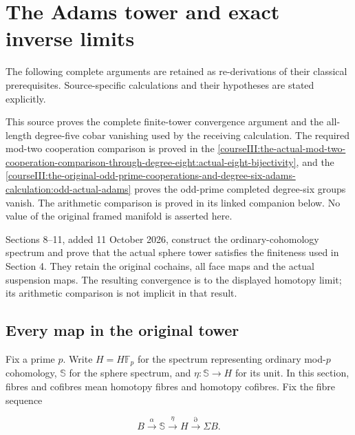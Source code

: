 \section{The Adams tower and exact inverse limits}\label{courseIII:the-adams-tower-and-exact-inverse-limits:section}

The following complete arguments are retained as re-derivations of their classical prerequisites. Source-specific calculations and their hypotheses are stated explicitly.

This source proves the complete finite-tower convergence argument and the all-length degree-five cobar vanishing used by the receiving calculation. The required mod-two cooperation comparison is proved in the \cref{courseIII:the-actual-mod-two-cooperation-comparison-through-degree-eight:actual-eight-bijectivity}, and the \cref{courseIII:the-original-odd-prime-cooperations-and-degree-six-adams-calculation:odd-actual-adams} proves the odd-prime completed degree-six groups vanish. The arithmetic comparison is proved in its linked companion below. No value of the original framed manifold is asserted here.

Sections 8--11, added 11 October 2026, construct the ordinary-cohomology spectrum and prove that the actual sphere tower satisfies the finiteness used in Section 4. They retain the original cochains, all face maps and the actual suspension maps. The resulting convergence is to the displayed homotopy limit; its arithmetic comparison is not implicit in that result.

\subsection{Every map in the original tower}
\label{courseIII:the-adams-tower-and-exact-inverse-limits:adams-original-tower}

\label{courseIII:the-adams-tower-and-exact-inverse-limits:section-1}\label{courseIII:adams-tower:1}

Fix a prime \(p\). Write \(H=H\mathbb F_p\) for the spectrum representing ordinary mod-\(p\) cohomology, \(\mathbb S\) for the sphere spectrum, and \(\eta:\mathbb S\to H\) for its unit. In this section, fibres and cofibres mean homotopy fibres and homotopy cofibres. Fix the fibre sequence

\begin{equation}
B\xrightarrow{\alpha}\mathbb S\xrightarrow{\eta}H
     \xrightarrow{\partial}\Sigma B.
 \label{courseIII:the-adams-tower-and-exact-inverse-limits:eq:1.1}
\end{equation}

